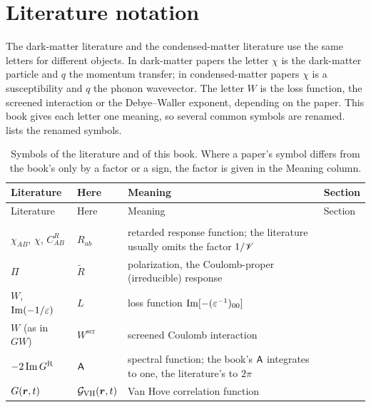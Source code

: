 \section{Literature notation}\label{app:B.2}

The dark-matter literature and the condensed-matter literature use the same letters for different objects. In dark-matter papers the letter $\chi$ is the dark-matter particle and $q$ the momentum transfer; in condensed-matter papers $\chi$ is a susceptibility and $q$ the phonon wavevector. The letter $W$ is the loss function, the screened interaction or the Debye--Waller exponent, depending on the paper. This book gives each letter one meaning, so several common symbols are renamed.  lists the renamed symbols.

{\small
\setlength{\tabcolsep}{4pt}
\begin{longtable}{@{}>{\raggedright\arraybackslash}p{}>{\raggedright\arraybackslash}p{}>{\raggedright\arraybackslash}p{}>{\raggedright\arraybackslash}p{}@{}}
\caption{Symbols of the literature and of this book. Where a paper's symbol differs from the book's only by a factor or a sign, the factor is given in the Meaning column.}\label{tab:B-literature}\\
\toprule
Literature & Here & Meaning & Section \\
\midrule
\endfirsthead
\toprule
Literature & Here & Meaning & Section \\
\midrule
\endhead
\bottomrule
\endfoot
\multicolumn{4}{@{}l}{\itshape Response and screening}\\*
$\chi_{AB}$, $\chi$, $C^R_{AB}$ & $R_{ab}$ & retarded response function; the literature usually omits the factor $1/\mathscr{V}$ & {sec:4.1} \\
$\Pi$ & $\tilde R$ & polarization, the Coulomb-proper (irreducible) response & {sec:4.4} \\
$W$, $\operatorname{Im}(-1/\varepsilon)$ & $L$ & loss function $\operatorname{Im}[-(\varepsilon^{-1})_{00}]$ & {sec:4.4} \\
$W$ (as in $GW$) & $W^{\mathrm{scr}}$ & screened Coulomb interaction & {sec:4.8} \\
$-2\operatorname{Im} G^{\mathrm{R}}$ & $\mathsf{A}$ & spectral function; the book's $\mathsf{A}$ integrates to one, the literature's to $2\pi$ & {sec:4.7} \\
$G(\bm{r},t)$ & $\mathcal{G}_{\mathrm{VH}}(\bm{r},t)$ & Van Hove correlation function & {sec:4.2} \\

\end{longtable}}
